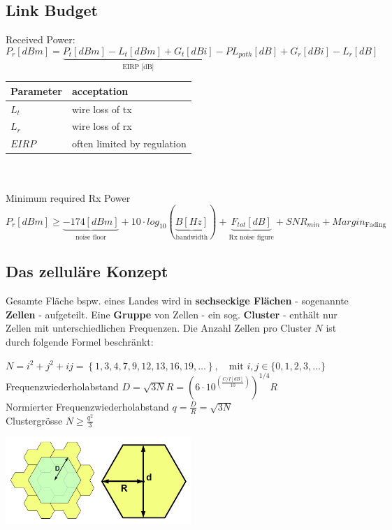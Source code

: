 \subsection{Link Budget}
Received Power:
\begin{equation}
	P_r [dBm] = \underbrace{P_t [dBm] - L_t [dBm] + G_t[dBi]}_{ \text{EIRP [dB]} } - PL_{path}[dB] + G_r[dBi] -L_r[dB]
\end{equation}

\begin{tabular}{ll}
\textbf{Parameter} & \textbf{acceptation} \\ \hline
$L_t$ & wire loss of tx \\ 
$L_r$ & wire loss of rx \\ 
$EIRP$ & often limited by regulation \\ 
\end{tabular} \\ \\

Minimum required Rx Power
\begin{equation}
	P_r [dBm] \geq \underbrace{-174[dBm]}_{ \text{noise floor} } + 10 \cdot log_{10}(\underbrace{B [Hz]}_{\text{bandwidth} }) + 
	\underbrace{F_{tot}[dB]}_{ \text{Rx noise figure} } + SNR_{min} + Margin_{ \text{Fading} }
\end{equation}

\subsection{Das zelluläre Konzept }
	\begin{minipage}{12cm}
		Gesamte Fläche bspw. eines Landes wird in \textbf{sechseckige Flächen} - sogenannte \textbf{Zellen} - aufgeteilt. 
		Eine \textbf{Gruppe} von Zellen - ein sog. \textbf{Cluster} - enthält nur Zellen mit unterschiedlichen Frequenzen.
		Die Anzahl Zellen pro Cluster $N$ ist durch folgende Formel beschränkt:
		\begin{center}
	        $ N=i^2+j^2+ij = \left\{1,3,4,7,9,12,13,16,19,\ldots\right\}, \quad \text{mit } i,j \in
	        \{0,1,2,3,\ldots \} $ \\ Frequenzwiederholabstand $ D = \sqrt{3N} R = (6\cdot 10^{(\frac{C/I[dB]}{10})})^{1/4} R$ \\ Normierter Frequenzwiederholabstand $q = \frac{D}{R} =
	        \sqrt{3N}$ \\ Clustergrösse $N \geq \frac{q^2}{3}$
        \end{center}
	\end{minipage}
	\begin{minipage}{8cm}
	    \includegraphics[width=7cm]{./bilder/systems-cluster.png}
	\end{minipage}

